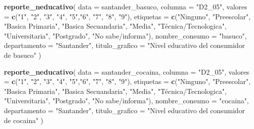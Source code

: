 \documentclass[
]{article}
\newenvironment{Shaded}{\begin{snugshade}}{\end{snugshade}}
\newcommand{\AttributeTok}[1]{\textcolor[rgb]{0.13,0.29,0.53}{#1}}
\newcommand{\FunctionTok}[1]{\textcolor[rgb]{0.13,0.29,0.53}{\textbf{#1}}}
\newcommand{\NormalTok}[1]{#1}
\newcommand{\StringTok}[1]{\textcolor[rgb]{0.31,0.60,0.02}{#1}}
\begin{document}
\begin{Shaded}
\begin{Highlighting}[]
\FunctionTok{reporte\_neducativo}\NormalTok{(}
  \AttributeTok{data =}\NormalTok{ santander\_basuco,}
  \AttributeTok{columna =} \StringTok{"D2\_05"}\NormalTok{,}
  \AttributeTok{valores =} \FunctionTok{c}\NormalTok{(}\StringTok{"1"}\NormalTok{, }\StringTok{"2"}\NormalTok{, }\StringTok{"3"}\NormalTok{, }\StringTok{"4"}\NormalTok{, }\StringTok{"5"}\NormalTok{,}\StringTok{"6"}\NormalTok{, }\StringTok{"7"}\NormalTok{, }\StringTok{"8"}\NormalTok{, }\StringTok{"9"}\NormalTok{),}
  \AttributeTok{etiquetas =} \FunctionTok{c}\NormalTok{(}\StringTok{"Ninguno"}\NormalTok{, }\StringTok{"Preescolar"}\NormalTok{, }\StringTok{"Basica Primaria"}\NormalTok{, }\StringTok{"Basica Secuandaria"}\NormalTok{, }\StringTok{"Media"}\NormalTok{, }\StringTok{"Técnica/Tecnologica"}\NormalTok{, }\StringTok{"Universitaria"}\NormalTok{, }\StringTok{"Postgrado"}\NormalTok{, }\StringTok{"No sabe/informa"}\NormalTok{),}
  \AttributeTok{nombre\_consumo =} \StringTok{"basuco"}\NormalTok{,}
  \AttributeTok{departamento =} \StringTok{"Santander"}\NormalTok{,}
  \AttributeTok{titulo\_grafico =} \StringTok{"Nivel educativo del consumidor de basuco"}
\NormalTok{)}

\FunctionTok{reporte\_neducativo}\NormalTok{(}
  \AttributeTok{data =}\NormalTok{ santander\_cocaina,}
  \AttributeTok{columna =} \StringTok{"D2\_05"}\NormalTok{,}
  \AttributeTok{valores =} \FunctionTok{c}\NormalTok{(}\StringTok{"1"}\NormalTok{, }\StringTok{"2"}\NormalTok{, }\StringTok{"3"}\NormalTok{, }\StringTok{"4"}\NormalTok{, }\StringTok{"5"}\NormalTok{,}\StringTok{"6"}\NormalTok{, }\StringTok{"7"}\NormalTok{, }\StringTok{"8"}\NormalTok{, }\StringTok{"9"}\NormalTok{),}
  \AttributeTok{etiquetas =} \FunctionTok{c}\NormalTok{(}\StringTok{"Ninguno"}\NormalTok{, }\StringTok{"Preescolar"}\NormalTok{, }\StringTok{"Basica Primaria"}\NormalTok{, }\StringTok{"Basica Secuandaria"}\NormalTok{, }\StringTok{"Media"}\NormalTok{, }\StringTok{"Técnica/Tecnologica"}\NormalTok{, }\StringTok{"Universitaria"}\NormalTok{, }\StringTok{"Postgrado"}\NormalTok{, }\StringTok{"No sabe/informa"}\NormalTok{),}
  \AttributeTok{nombre\_consumo =} \StringTok{"cocaina"}\NormalTok{,}
  \AttributeTok{departamento =} \StringTok{"Santander"}\NormalTok{,}
  \AttributeTok{titulo\_grafico =} \StringTok{"Nivel educativo del consumidor de cocaina"}
\NormalTok{)}


\end{Highlighting}
\end{Shaded}
\end{document}
